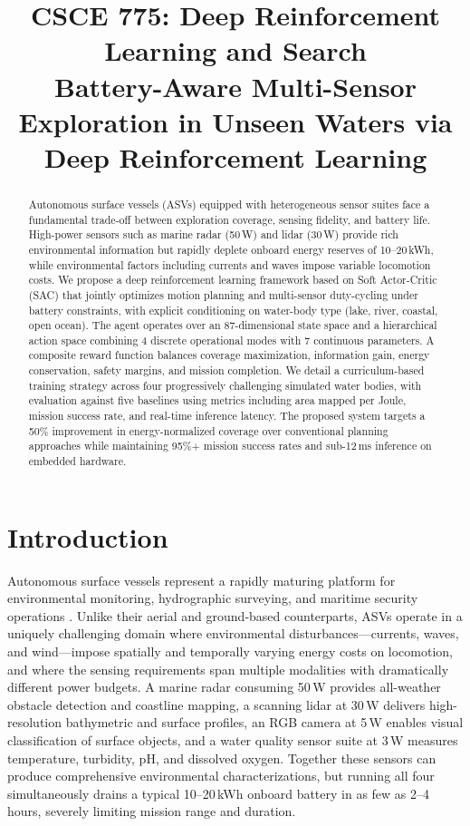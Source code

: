 \documentclass[conference]{IEEEtran}
\title{
\vspace{-0.5cm}
{\normalsize CSCE 775: Deep Reinforcement Learning and Search} \\[0.3em]
Battery-Aware Multi-Sensor Exploration in Unseen Waters via Deep Reinforcement Learning
}
\author{
\IEEEauthorblockN{Jacob Whisenant, Xeerak Muhammed, J.C. Vaught}
\IEEEauthorblockA{Department of Computer Science and Engineering\\
University of South Carolina, Columbia, SC 29208}
}
\begin{document}
\maketitle

\begin{abstract}
Autonomous surface vessels (ASVs) equipped with heterogeneous sensor suites face a fundamental trade-off between exploration coverage, sensing fidelity, and battery life. High-power sensors such as marine radar (50\,W) and lidar (30\,W) provide rich environmental information but rapidly deplete onboard energy reserves of 10--20\,kWh, while environmental factors including currents and waves impose variable locomotion costs. We propose a deep reinforcement learning framework based on Soft Actor-Critic (SAC) that jointly optimizes motion planning and multi-sensor duty-cycling under battery constraints, with explicit conditioning on water-body type (lake, river, coastal, open ocean). The agent operates over an 87-dimensional state space and a hierarchical action space combining 4 discrete operational modes with 7 continuous parameters. A composite reward function balances coverage maximization, information gain, energy conservation, safety margins, and mission completion. We detail a curriculum-based training strategy across four progressively challenging simulated water bodies, with evaluation against five baselines using metrics including area mapped per Joule, mission success rate, and real-time inference latency. The proposed system targets a 50\% improvement in energy-normalized coverage over conventional planning approaches while maintaining 95\%+ mission success rates and sub-12\,ms inference on embedded hardware.
\end{abstract}


\section{Introduction}

Autonomous surface vessels represent a rapidly maturing platform for environmental monitoring, hydrographic surveying, and maritime security operations \cite{Bai2022ASVSurvey}. Unlike their aerial and ground-based counterparts, ASVs operate in a uniquely challenging domain where environmental disturbances---currents, waves, and wind---impose spatially and temporally varying energy costs on locomotion, and where the sensing requirements span multiple modalities with dramatically different power budgets. A marine radar consuming 50\,W provides all-weather obstacle detection and coastline mapping, a scanning lidar at 30\,W delivers high-resolution bathymetric and surface profiles, an RGB camera at 5\,W enables visual classification of surface objects, and a water quality sensor suite at 3\,W measures temperature, turbidity, pH, and dissolved oxygen. Together these sensors can produce comprehensive environmental characterizations, but running all four simultaneously drains a typical 10--20\,kWh onboard battery in as few as 2--4 hours, severely limiting mission range and duration.
\end{document}
